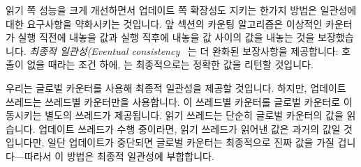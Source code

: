 읽기 쪽 성능을 크게 개선하면서 업데이트 쪽 확장성도 지키는 한가지 방법은
일관성에 대한 요구사항을 약화시키는 것입니다.
앞 섹션의 카운팅 알고리즘은 이상적인 카운터가  실행 직전에
내놓을 값과 실행 직후에 내놓을 값 사이의 값을 내놓는 것을 보장했습니다.
\emph{최종적 일관성(Eventual consistency}~\cite{WernerVogels:2009:EventuallyConsistent}
는 더 완화된 보장사항을 제공합니다:  호출이 없을 때라는 조건
하에,  는 최종적으로는 정확한 값을 리턴할 것입니다.

우리는 글로벌 카운터를 사용해 최종적 일관성을 제공할 것입니다.
하지만, 업데이트 쓰레드는 쓰레드별 카운터만을 사용합니다.
이 쓰레드별 카운터를 글로벌 카운터로 이동시키는 별도의 쓰레드가 제공됩니다.
읽기 쓰레드는 단순히 글로벌 카운터의 값을 읽습니다.
업데이트 쓰레드가 수행 중이라면, 읽기 쓰레드가 읽어낸 값은 과거의 값일
것입니다만, 일단 업데이트가 중단되면 글로벌 카운터는 최종적으로 진짜 값을 가질
겁니다---따라서 이 방법은 최종적 일관성에 부합합니다.

